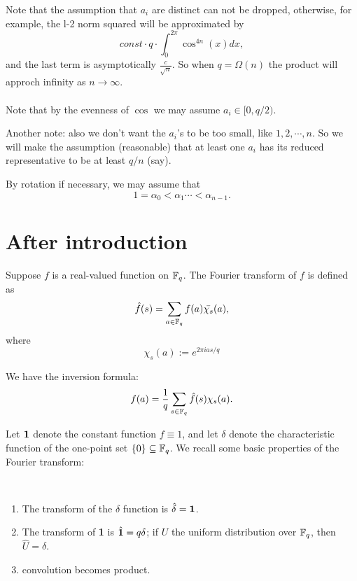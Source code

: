 \documentclass{amsart}
\begin{document}
Note that the assumption that $a_i$ are distinct can not be dropped, otherwise, for example, the l-2 norm squared will be approximated by
\[
    const \cdot q \cdot \int_{0}^{2 \pi} \cos^{4n}(x) dx,
\]
and the last term is asymptotically $\frac{c}{\sqrt{n}}$. So when $q = \Omega(n)$ the product will approch infinity as $n \to \infty$. \\ \\

Note that by the evenness of $\cos$ we may assume $a_i \in [0, q/2)$.

Another note: also we don't want the $a_i$'s to be too small, like $1,2, \cdots, n$. So we will make the assumption (reasonable) that at least one $a_i$ has its reduced representative to be at least $q/n$ (say).

By rotation if necessary, we may assume that
$$1 =\alpha_0 < \alpha_1 \cdots < \alpha_{n-1}.$$
\fi

\section{After introduction}

Suppose $f$ is a real-valued function on $\mathbb{F}_q$. The Fourier transform of $f$ is defined as
\[
    \hat{f}(s) = \sum_{a \in \mathbb{F}_q} f(a) \bar{\chi_s}(a),
\]
where $$\chi_s(a) := e^{2 \pi i as/q}$$

We have the inversion formula:
\[
    f(a) = \frac{1}{q} \sum_{s \in \mathbb{F}_q} \hat{f}(s)\chi_s(a).
\]

Let ${\bf 1}$ denote the constant function $f \equiv 1$, and let $\delta$ denote the characteristic function of the
one-point set $\{0\} \subseteq \mathbb{F}_q$. We recall some basic properties of the Fourier transform:

\begin{Prop} \hfill \\
\begin{enumerate}
\item The transform of the $\delta$ function is $\hat{\delta} = {\bf 1}$.

\item The transform of {\bf 1} is $\hat{{\bf 1}} = q\delta$; if $U$ the uniform distribution over $\mathbb{F}_q$, then $\hat{U} = \delta$.

\item convolution becomes product.


\end{enumerate}
\end{Prop}
\end{document}
